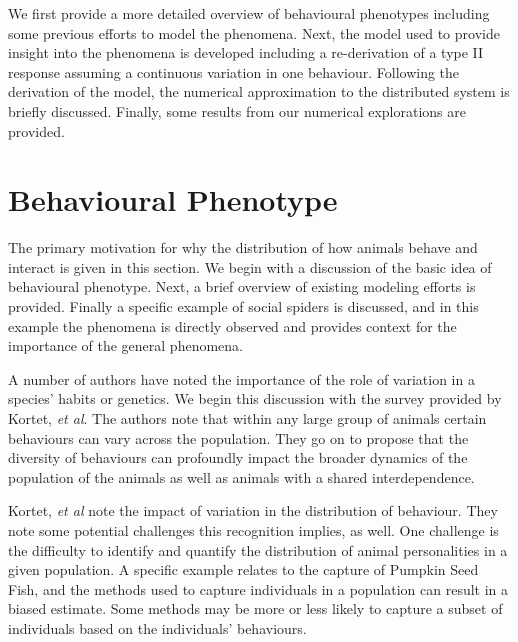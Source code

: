 \documentclass[12pt]{article}
\begin{document}
We first provide a more detailed overview of behavioural phenotypes
including some previous efforts to model the phenomena. Next, the
model used to provide insight into the phenomena is developed
including a re-derivation of a type II response assuming a continuous
variation in one behaviour. Following the derivation of the model, the
numerical approximation to the distributed system is briefly
discussed. Finally, some results from our numerical explorations are
provided.

\section{Behavioural Phenotype}
\label{section:behaviouralPhenotype}

The primary motivation for why the distribution of how animals behave
and interact is given in this section. We begin with a discussion of
the basic idea of behavioural phenotype. Next, a brief overview of
existing modeling efforts is provided. Finally a specific example of
social spiders is discussed, and in this example the phenomena is
directly observed and provides context for the importance of the
general phenomena.

A number of authors have noted the importance of the role of variation
in a species' habits or
genetics\cite{doi:10.1111/j.1461-0248.2010.01536.x,doi:10.1086/687235,mierzejewski_horn_luong_2019,SANTICCHIA20191,doi:10.1098/rspb.2014.1016,FARINE2015609}. We
begin this discussion with the survey provided by Kortet, \textit{et
  al}\cite{doi:10.1111/j.1461-0248.2010.01536.x}. The authors note
that within any large group of animals certain behaviours can vary
across the population. They go on to propose that the diversity of
behaviours can profoundly impact the broader dynamics of the
population of the animals as well as animals with a shared
interdependence.

Kortet, \textit{et al}\cite{doi:10.1111/j.1461-0248.2010.01536.x} note
the impact of variation in the distribution of behaviour. They note
some potential challenges this recognition implies, as well. One
challenge is the difficulty to identify and quantify the distribution
of animal personalities in a given population. A specific example
relates to the capture of Pumpkin Seed
Fish\cite{doi:10.1037/0735-7036.107.3.250}, and the methods used to
capture individuals in a population can result in a biased estimate.
Some methods may be more or less likely to capture a subset of
individuals based on the individuals' behaviours.
\end{document}
